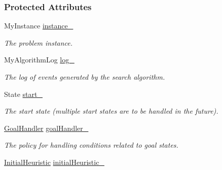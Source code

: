 \subsubsection*{Protected Attributes}
\begin{DoxyCompactItemize}
\item 
My\+Instance \hyperlink{structslb_1_1ext_1_1algorithm_1_1Algorithm_a2924c26498dd2658fa0cc20a47f78d0d}{instance\+\_\+}\hypertarget{structslb_1_1ext_1_1algorithm_1_1Algorithm_a2924c26498dd2658fa0cc20a47f78d0d}{}\label{structslb_1_1ext_1_1algorithm_1_1Algorithm_a2924c26498dd2658fa0cc20a47f78d0d}

\begin{DoxyCompactList}\small\item\em The problem instance. \end{DoxyCompactList}\item 
My\+Algorithm\+Log \hyperlink{structslb_1_1ext_1_1algorithm_1_1Algorithm_aa63e4ab3a6f3b2632320018760c923fd}{log\+\_\+}\hypertarget{structslb_1_1ext_1_1algorithm_1_1Algorithm_aa63e4ab3a6f3b2632320018760c923fd}{}\label{structslb_1_1ext_1_1algorithm_1_1Algorithm_aa63e4ab3a6f3b2632320018760c923fd}

\begin{DoxyCompactList}\small\item\em The log of events generated by the search algorithm. \end{DoxyCompactList}\item 
State \hyperlink{structslb_1_1ext_1_1algorithm_1_1Algorithm_a202dfe3bac28cb6a97246d378080f704}{start\+\_\+}\hypertarget{structslb_1_1ext_1_1algorithm_1_1Algorithm_a202dfe3bac28cb6a97246d378080f704}{}\label{structslb_1_1ext_1_1algorithm_1_1Algorithm_a202dfe3bac28cb6a97246d378080f704}

\begin{DoxyCompactList}\small\item\em The start state (multiple start states are to be handled in the future). \end{DoxyCompactList}\item 
\hyperlink{structslb_1_1ext_1_1algorithm_1_1Algorithm_ae0c6a75028107e4642e43798f21f4bfc}{Goal\+Handler} \hyperlink{structslb_1_1ext_1_1algorithm_1_1Algorithm_a88c9b86bd51e50df1f2da840eed1ec46}{goal\+Handler\+\_\+}\hypertarget{structslb_1_1ext_1_1algorithm_1_1Algorithm_a88c9b86bd51e50df1f2da840eed1ec46}{}\label{structslb_1_1ext_1_1algorithm_1_1Algorithm_a88c9b86bd51e50df1f2da840eed1ec46}

\begin{DoxyCompactList}\small\item\em The policy for handling conditions related to goal states. \end{DoxyCompactList}\item 
\hyperlink{structslb_1_1ext_1_1algorithm_1_1Algorithm_ad1f8f28e7b07f747ef7b7b5bf0643c2d}{Initial\+Heuristic} \hyperlink{structslb_1_1ext_1_1algorithm_1_1Algorithm_a21c643fd7b13c678ee91ad70203148bb}{initial\+Heuristic\+\_\+}\hypertarget{structslb_1_1ext_1_1algorithm_1_1Algorithm_a21c643fd7b13c678ee91ad70203148bb}{}\label{structslb_1_1ext_1_1algorithm_1_1Algorithm_a21c643fd7b13c678ee91ad70203148bb}


\end{DoxyCompactItemize}

